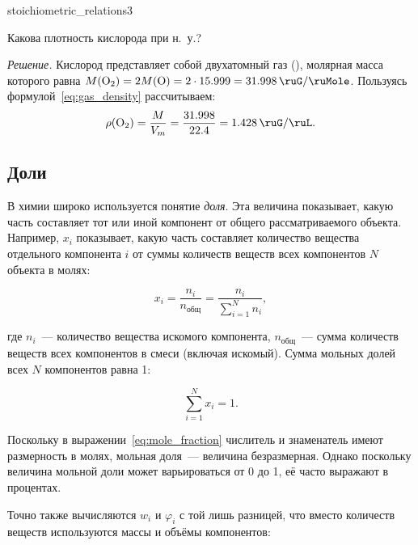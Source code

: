 \begin{example}{}{stoichiometric_relations3}
    \begin{condition}
        Какова плотность кислорода при н.~у.?
    \end{condition}

    \medskip

    \textit{Решение.} Кислород представляет собой двухатомный газ (), молярная масса которого равна $M(\ce{O2}) = 2M(\ce{O}) = 2 \cdot \num{15,999} = \qty{31,998}{\ruG\per\ruMole}$. Пользуясь формулой~\eqref{eq:gas_density} рассчитываем:
    \begin{equation*}
        {\rho}(\ce{O2}) = \frac{M}{V_m} = \frac{\num{31,998}}{\num{22,4}} = \qty{1,428}{\ruG\per\ruL}.
    \end{equation*}
\end{example}

\subsection*{Доли}

В химии широко используется понятие \emph{доля}. Эта величина показывает, какую часть составляет тот или иной компонент от общего рассматриваемого объекта. Например,  $x_i$ показывает, какую часть составляет количество вещества отдельного компонента $i$ от суммы количеств веществ всех компонентов $N$ объекта в молях:

\begin{equation}
    \label{eq:mole_fraction}
    \boxed{x_i = \frac{n_i}{n_{\text{общ}}} = \frac{n_i}{\sum_{i = 1}^{N} n_i}},
\end{equation}

где $n_i$~--- количество вещества искомого компонента, $n_{\text{общ}}$~--- сумма количеств веществ всех компонентов в смеси (включая искомый). Сумма мольных долей всех $N$ компонентов равна 1:

\begin{equation*}
    \sum_{i = 1}^{N} x_i = 1.
\end{equation*}

Поскольку в выражении~\eqref{eq:mole_fraction} числитель и знаменатель имеют размерность в молях, мольная доля~--- величина безразмерная. Однако поскольку величина мольной доли может варьироваться от 0 до 1, её часто выражают в процентах.

Точно также вычисляются  $w_i$ и  ${\varphi}_i $ с той лишь разницей, что вместо количеств веществ используются массы и объёмы компонентов:

